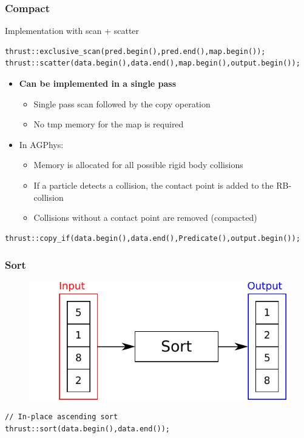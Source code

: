 \documentclass[aspectratio=169,handout]{beamer}
\begin{document}
\begin{frame}[fragile]
\frametitle{Compact}
Implementation with scan + scatter
\begin{lstlisting}
thrust::exclusive_scan(pred.begin(),pred.end(),map.begin());
thrust::scatter(data.begin(),data.end(),map.begin(),output.begin());
\end{lstlisting}
\begin{itemize}
	\item \textbf{Can be implemented in a single pass}
	\begin{itemize}
		\item Single pass scan followed by the copy operation
		\item No tmp memory for the map is required
	\end{itemize}
	\item<3-> In AGPhys:
	\begin{itemize}
		\item Memory is allocated for all possible rigid body collisions
		\item If a particle detects a collision, the contact point is added to the RB-collision
		\item Collisions without a contact point are removed (compacted)
	\end{itemize}
\end{itemize}
\begin{lstlisting}
thrust::copy_if(data.begin(),data.end(),Predicate(),output.begin());
\end{lstlisting}
\end{frame}



\begin{frame}[fragile]
\frametitle{Sort}
\begin{figure}
	\centering
	\includegraphics[height=0.6\textheight]{o_sort}
\end{figure}

\begin{lstlisting}
// In-place ascending sort
thrust::sort(data.begin(),data.end());
\end{lstlisting}
\end{frame}
\end{document}
